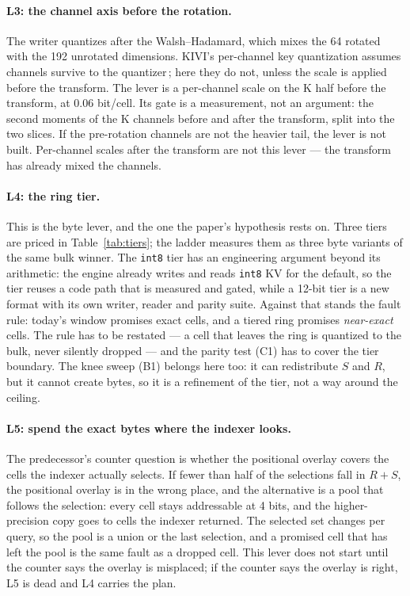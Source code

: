 \documentclass[10pt,twocolumn]{article}
\begin{document}
\paragraph{L3: the channel axis before the rotation.} The writer quantizes after the Walsh--Hadamard, which mixes the 64 rotated with the 192 unrotated dimensions. KIVI's per-channel key quantization assumes channels survive to the quantizer\,\cite{kivi}; here they do not, unless the scale is applied before the transform. The lever is a per-channel scale on the K half before the transform, at 0.06 bit/cell. Its gate is a measurement, not an argument: the second moments of the K channels before and after the transform, split into the two slices. If the pre-rotation channels are not the heavier tail, the lever is not built. Per-channel scales after the transform are not this lever --- the transform has already mixed the channels.

\paragraph{L4: the ring tier.} This is the byte lever, and the one the paper's hypothesis rests on. Three tiers are priced in Table~\ref{tab:tiers}; the ladder measures them as three byte variants of the same bulk winner. The \texttt{int8} tier has an engineering argument beyond its arithmetic: the engine already writes and reads \texttt{int8} KV for the default, so the tier reuses a code path that is measured and gated, while a 12-bit tier is a new format with its own writer, reader and parity suite. Against that stands the fault rule: today's window promises exact cells, and a tiered ring promises \emph{near-exact} cells. The rule has to be restated --- a cell that leaves the ring is quantized to the bulk, never silently dropped --- and the parity test (C1) has to cover the tier boundary. The knee sweep (B1) belongs here too: it can redistribute $S$ and $R$, but it cannot create bytes, so it is a refinement of the tier, not a way around the ceiling.

\paragraph{L5: spend the exact bytes where the indexer looks.} The predecessor's counter question is whether the positional overlay covers the cells the indexer actually selects. If fewer than half of the selections fall in $R{+}S$, the positional overlay is in the wrong place, and the alternative is a pool that follows the selection: every cell stays addressable at 4 bits, and the higher-precision copy goes to cells the indexer returned. The selected set changes per query, so the pool is a union or the last selection, and a promised cell that has left the pool is the same fault as a dropped cell. This lever does not start until the counter says the overlay is misplaced; if the counter says the overlay is right, L5 is dead and L4 carries the plan.
\end{document}
